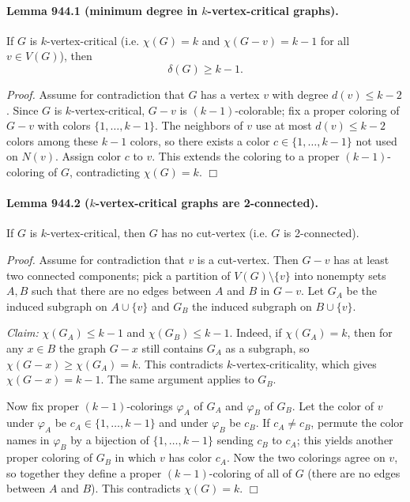 \paragraph{Lemma 944.1 (minimum degree in $k$-vertex-critical graphs).}
If $G$ is $k$-vertex-critical (i.e. $\chi(G)=k$ and $\chi(G-v)=k-1$ for all $v\in V(G)$), then
\[
\delta(G)\ge k-1.
\]

\emph{Proof.}
Assume for contradiction that $G$ has a vertex $v$ with degree $d(v)\le k-2$.
Since $G$ is $k$-vertex-critical, $G-v$ is $(k-1)$-colorable; fix a proper coloring of $G-v$ with colors $\{1,\dots,k-1\}$.
The neighbors of $v$ use at most $d(v)\le k-2$ colors among these $k-1$ colors, so there exists a color $c\in\{1,\dots,k-1\}$ not used on $N(v)$.
Assign color $c$ to $v$. This extends the coloring to a proper $(k-1)$-coloring of $G$, contradicting $\chi(G)=k$.
\hfill $\Box$

\paragraph{Lemma 944.2 ($k$-vertex-critical graphs are 2-connected).}
If $G$ is $k$-vertex-critical, then $G$ has no cut-vertex (i.e. $G$ is 2-connected).

\emph{Proof.}
Assume for contradiction that $v$ is a cut-vertex. Then $G-v$ has at least two connected components; pick a partition of $V(G)\setminus\{v\}$ into nonempty sets $A,B$ such that there are no edges between $A$ and $B$ in $G-v$.
Let $G_A$ be the induced subgraph on $A\cup\{v\}$ and $G_B$ the induced subgraph on $B\cup\{v\}$.

\emph{Claim:} $\chi(G_A)\le k-1$ and $\chi(G_B)\le k-1$.
Indeed, if $\chi(G_A)=k$, then for any $x\in B$ the graph $G-x$ still contains $G_A$ as a subgraph, so $\chi(G-x)\ge \chi(G_A)=k$. This contradicts $k$-vertex-criticality, which gives $\chi(G-x)=k-1$. The same argument applies to $G_B$.

Now fix proper $(k-1)$-colorings $\varphi_A$ of $G_A$ and $\varphi_B$ of $G_B$.
Let the color of $v$ under $\varphi_A$ be $c_A\in\{1,\dots,k-1\}$ and under $\varphi_B$ be $c_B$.
If $c_A\ne c_B$, permute the color names in $\varphi_B$ by a bijection of $\{1,\dots,k-1\}$ sending $c_B$ to $c_A$; this yields another proper coloring of $G_B$ in which $v$ has color $c_A$.
Now the two colorings agree on $v$, so together they define a proper $(k-1)$-coloring of all of $G$ (there are no edges between $A$ and $B$).
This contradicts $\chi(G)=k$.
\hfill $\Box$

